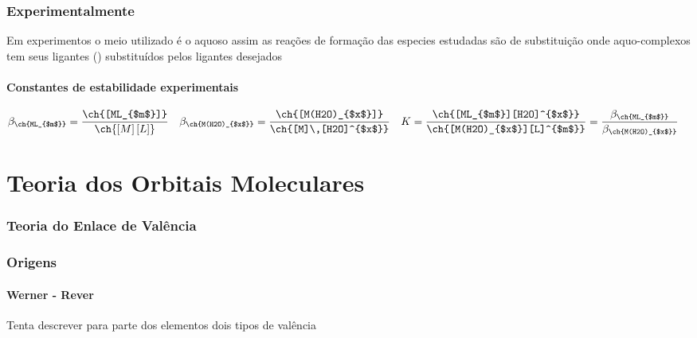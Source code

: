 \documentclass{article}
\begin{document}
{{%
\section{Experimentalmente}
%
Em experimentos o meio utilizado é o aquoso assim as reações de formação das especies estudadas são de substituição onde aquo-complexos tem seus ligantes () substituídos pelos ligantes desejados
%

\begin{center}\large


\end{center}

\subsection{Constantes de estabilidade experimentais}

\begin{align*}
&
	\beta_{\ch{ML_{$m$}}} 
=	\frac{\ch{[ML_{$m$}]}}
		{\ch{[M]\,[L]}}
& &
	\beta_{\ch{M(H2O)_{$x$}}}
=	\frac{\ch{[M(H2O)_{$x$}]}}
		{\ch{[M]\,[H2O]^{$x$}}}
& &
	K
=	\frac{\ch{[ML_{$m$}][H2O]^{$x$}}}
		{\ch{[M(H2O)_{$x$}][L]^{$m$}}}
=	\frac{\beta_{\ch{ML_{$m$}}}}
		{\beta_{\ch{M(H2O)_{$x$}}}}
&
\end{align*}

\newpage

\part{Teoria dos Orbitais Moleculares}
\label{orbitais moleculares}


\section{Teoria do Enlace de Valência}
\label{enlace de valencia}

\section{Origens}

\subsection{Werner - Rever}
%
Tenta descrever para parte dos elementos dois tipos de valência
%
\begin{multicols}{2}
	

\end{multicols}}}
\end{document}
